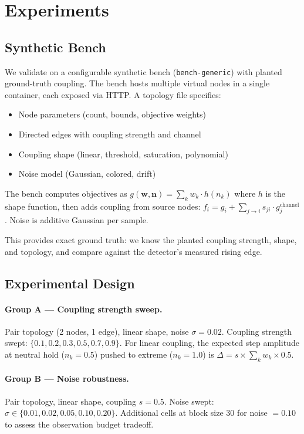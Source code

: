 \section{Experiments}
\label{sec:experiments}

\subsection{Synthetic Bench}

We validate on a configurable synthetic bench
(\texttt{bench-generic}) with planted ground-truth coupling. The
bench hosts multiple virtual nodes in a single container, each
exposed via HTTP. A topology file specifies:

\begin{itemize}
  \item Node parameters (count, bounds, objective weights)
  \item Directed edges with coupling strength and channel
  \item Coupling shape (linear, threshold, saturation, polynomial)
  \item Noise model (Gaussian, colored, drift)
\end{itemize}

The bench computes objectives as
$g(\mathbf{w}, \mathbf{n}) = \sum_k w_k \cdot h(n_k)$ where $h$ is the
shape function, then adds coupling from source nodes:
$f_i = g_i + \sum_{j \to i} s_{ji} \cdot g_j^{\text{channel}}$.
Noise is additive Gaussian per sample.

This provides exact ground truth: we know the planted coupling
strength, shape, and topology, and compare against the detector's
measured rising edge.

\subsection{Experimental Design}

\paragraph{Group A --- Coupling strength sweep.}
Pair topology (2 nodes, 1 edge), linear shape, noise $\sigma = 0.02$.
Coupling strength swept: $\{0.1, 0.2, 0.3, 0.5, 0.7, 0.9\}$.
For linear coupling, the expected step amplitude at neutral hold
($n_k = 0.5$) pushed to extreme ($n_k = 1.0$) is
$\Delta = s \times \sum_k w_k \times 0.5$.

\paragraph{Group B --- Noise robustness.}
Pair topology, linear shape, coupling $s = 0.5$.
Noise swept: $\sigma \in \{0.01, 0.02, 0.05, 0.10, 0.20\}$.
Additional cells at block size 30 for noise $= 0.10$ to assess the
observation budget tradeoff.

